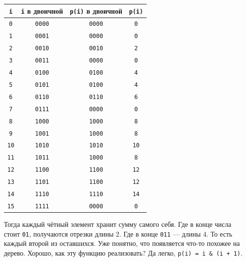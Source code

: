 \documentclass{article}
\newcommand{\pseudo}{PseudoLexer.py:PseudoLexer -x}
\newcommand{\pseudocode}[1]{\texttt{#1}}
\begin{document}
    \begin{center}
        \begin{tabular}{|c|c|c|c|}
            \hline
            \pseudocode{i} & \pseudocode{i} в двоичной & \pseudocode{p(i)} в двоичной & \pseudocode{p(i)}\\
            \hline
            \pseudocode{0} & \verb|0000| & \verb|0000| & \pseudocode{0}\\
            \pseudocode{1} & \verb|0001| & \verb|0000| & \pseudocode{0}\\
            \pseudocode{2} & \verb|0010| & \verb|0010| & \pseudocode{2}\\
            \pseudocode{3} & \verb|0011| & \verb|0000| & \pseudocode{0}\\
            \pseudocode{4} & \verb|0100| & \verb|0100| & \pseudocode{4}\\
            \pseudocode{5} & \verb|0101| & \verb|0100| & \pseudocode{4}\\
            \pseudocode{6} & \verb|0110| & \verb|0110| & \pseudocode{6}\\
            \pseudocode{7} & \verb|0111| & \verb|0000| & \pseudocode{0}\\
            \pseudocode{8} & \verb|1000| & \verb|1000| & \pseudocode{8}\\
            \pseudocode{9} & \verb|1001| & \verb|1000| & \pseudocode{8}\\
            \pseudocode{10} & \verb|1010| & \verb|1010| & \pseudocode{10}\\
            \pseudocode{11} & \verb|1011| & \verb|1000| & \pseudocode{8}\\
            \pseudocode{12} & \verb|1100| & \verb|1100| & \pseudocode{12}\\
            \pseudocode{13} & \verb|1101| & \verb|1100| & \pseudocode{12}\\
            \pseudocode{14} & \verb|1110| & \verb|1110| & \pseudocode{14}\\
            \pseudocode{15} & \verb|1111| & \verb|0000| & \pseudocode{0}\\
            \hline
        \end{tabular}
    \end{center}
    Тогда каждый чётный элемент хранит сумму самого себя. Где в конце числа стоит \verb|01|, получаются отрезки длины 2. Где в конце \verb|011| --- длины 4. То есть каждый второй из оставшихся. Уже понятно, что появляется что-то похожее на дерево. Хорошо, как эту функцию реализовать? Да легко, \pseudocode{p(i) = i & (i + 1)}.
\end{document}
